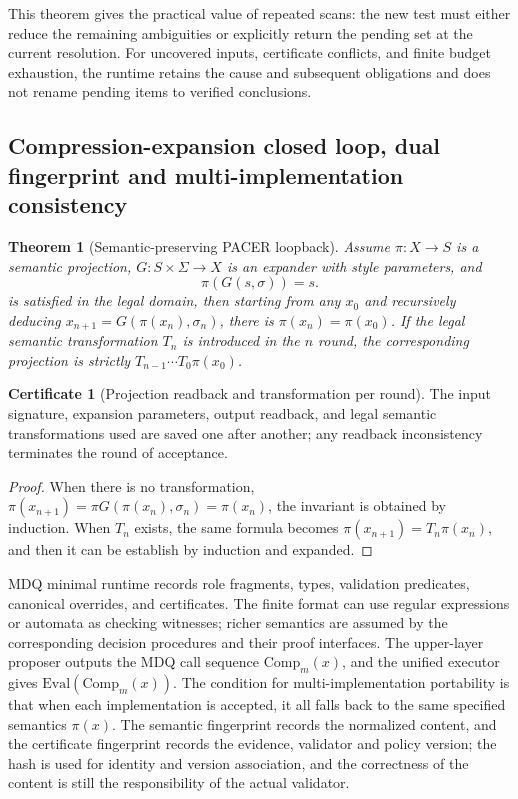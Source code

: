 \documentclass[11pt,a4paper]{article}
\theoremstyle{plain}
\newtheorem{theorem}{Theorem}[section]
\theoremstyle{definition}
\newtheorem*{certificate}{Certificate}
\theoremstyle{remark}
\begin{document}
\begin{CJK*}
This theorem gives the practical value of repeated scans: the new test must either reduce the remaining ambiguities or explicitly return the pending set at the current resolution. For uncovered inputs, certificate conflicts, and finite budget exhaustion, the runtime retains the cause and subsequent obligations and does not rename pending items to verified conclusions.

\subsection { Compression-expansion closed loop, dual fingerprint and multi-implementation consistency }

\begin{theorem}
[Semantic-preserving PACER loopback]\label{fa:thm-pacer}
Assume $\pi:X\to S$ is a semantic projection, $G:S\times\Sigma\to X$ is an expander with style parameters, and \[
 \pi(G(s,\sigma))=s.
\] is satisfied in the legal domain, then starting from any $x_0$ and recursively deducing $x_{n+1}=G(\pi(x_n),\sigma_n)$, there is $\pi(x_n)=\pi(x_0)$. If the legal semantic transformation $T_n$ is introduced in the $n$ round, the corresponding projection is strictly $T_{n-1}\cdots T_0\pi(x_0)$.\end{theorem}
\begin{certificate}
[Projection readback and transformation per round]The input signature, expansion parameters, output readback, and legal semantic transformations used are saved one after another; any readback inconsistency terminates the round of acceptance.\end{certificate}
\begin{proof}
When there is no transformation, $\pi(x_{n+1})=\pi G(\pi(x_n),\sigma_n)=\pi(x_n)$, the invariant is obtained by induction. When $T_n$ exists, the same formula becomes $\pi(x_{n+1})=T_n\pi(x_n)$, and then it can be establish by induction and expanded.\end{proof}


MDQ minimal runtime records role fragments, types, validation predicates, canonical overrides, and certificates. The finite format can use regular expressions or automata as checking witnesses; richer semantics are assumed by the corresponding decision procedures and their proof interfaces. The upper-layer proposer outputs the MDQ call sequence $\mathrm{Comp}_m(x)$, and the unified executor gives $\mathrm{Eval}(\mathrm{Comp}_m(x))$. The condition for multi-implementation portability is that when each implementation is accepted, it all falls back to the same specified semantics $\pi(x)$. The semantic fingerprint records the normalized content, and the certificate fingerprint records the evidence, validator and policy version; the hash is used for identity and version association, and the correctness of the content is still the responsibility of the actual validator. \cite{S12}


\end{CJK*}
\end{document}
